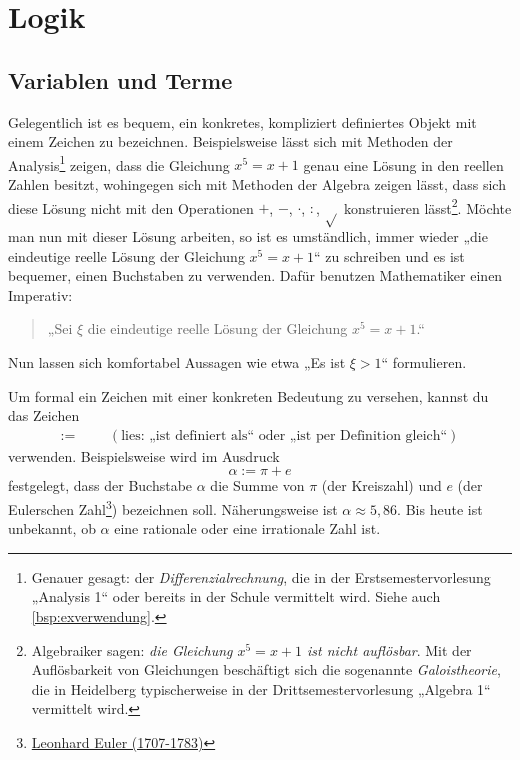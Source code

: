 

    

\chapter{Logik}


\section{Variablen und Terme}


\begin{nota} \label{zeichendefinieren}
    Gelegentlich ist es bequem, ein konkretes, kompliziert definiertes Objekt mit einem Zeichen zu bezeichnen. Beispielsweise lässt sich mit Methoden der Analysis\footnote{Genauer gesagt: der \emph{Differenzialrechnung}, die in der Erstsemestervorlesung „Analysis 1“ oder bereits in der Schule vermittelt wird. Siehe auch \cref{bsp:exverwendung}.} zeigen, dass die Gleichung $x^5=x+1$ genau eine Lösung in den reellen Zahlen besitzt, wohingegen sich mit Methoden der Algebra zeigen lässt, dass sich diese Lösung nicht mit den Operationen $+$, $-$, $\cdot$, $:$, $\sqrt{}$ konstruieren lässt\footnote{Algebraiker sagen: \emph{die Gleichung $x^5=x+1$ ist nicht auflösbar}. Mit der Auflösbarkeit von Gleichungen beschäftigt sich die sogenannte \emph{Galoistheorie}, die in Heidelberg typischerweise in der Drittsemestervorlesung „Algebra 1“ vermittelt wird.}. Möchte man nun mit dieser Lösung arbeiten, so ist es umständlich, immer wieder „die eindeutige reelle Lösung der Gleichung $x^5=x+1$“ zu schreiben und es ist bequemer, einen Buchstaben zu verwenden. Dafür benutzen Mathematiker einen Imperativ:
    \begin{quote}
        „Sei $\xi$ die eindeutige reelle Lösung der Gleichung $x^5=x+1$.“  
    \end{quote}
    Nun lassen sich komfortabel Aussagen wie etwa „Es ist $\xi>1$“ formulieren.
    
    Um formal ein Zeichen mit einer konkreten Bedeutung zu versehen, kannst du das Zeichen
    \begin{align*}
        := &&& (\text{lies: „ist definiert als“ oder „ist per Definition gleich“})
    \end{align*}
    verwenden. Beispielsweise wird im Ausdruck
        \[ \alpha:= \pi + e\]
    festgelegt, dass der Buchstabe $\alpha$ die Summe von $\pi$ (der Kreiszahl) und $e$ (der Eulerschen Zahl\footnote{\href{https://de.wikipedia.org/wiki/Leonhard_Euler}{Leonhard Euler (1707-1783)}}) bezeichnen soll. Näherungsweise ist $\alpha \approx 5{,}86$. Bis heute ist unbekannt, ob $\alpha$ eine rationale oder eine irrationale Zahl ist.
    

\end{nota}

